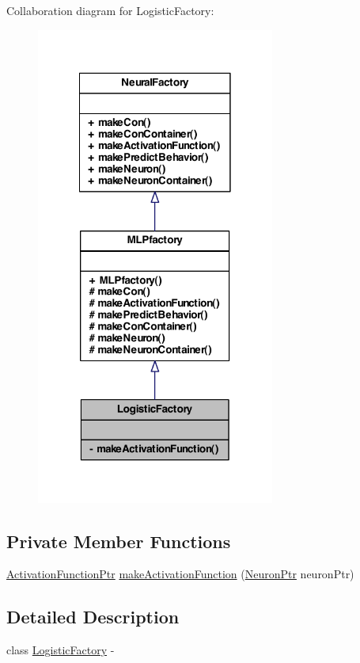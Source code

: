 Collaboration diagram for LogisticFactory:
\nopagebreak
\begin{figure}[H]
\begin{center}
\leavevmode
\includegraphics[width=222pt]{class_logistic_factory__coll__graph}
\end{center}
\end{figure}
\subsection*{Private Member Functions}
\begin{DoxyCompactItemize}
\item 
\hyperlink{_a_m_o_r_e_8h_a77602a0277a02e5769c3df0adc669b17}{ActivationFunctionPtr} \hyperlink{class_logistic_factory_a43d3c7497e5f4058f514f86cfd25d9f8}{makeActivationFunction} (\hyperlink{_a_m_o_r_e_8h_ac1ea936c2c7728eb382278131652fef4}{NeuronPtr} neuronPtr)
\end{DoxyCompactItemize}


\subsection{Detailed Description}
class \hyperlink{class_logistic_factory}{LogisticFactory} -\/ 

